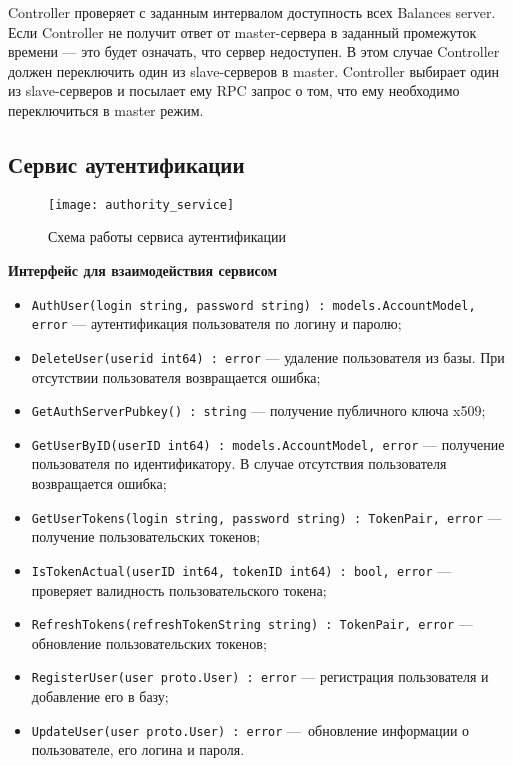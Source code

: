 Controller проверяет с заданным интервалом доступность всех Balances server. Если Controller не получит ответ от master-сервера в заданный промежуток времени — это будет означать, что сервер недоступен. В этом случае Controller должен переключить один из slave-серверов в master. Controller выбирает один из slave-серверов и посылает ему RPC запрос о том, что ему необходимо переключиться в master режим.

\subsection{Сервис аутентификации}

\begin{figure}[ht]
    \centering
    \texttt{[image: authority\_service]}
    \caption{Схема работы сервиса аутентификации}\label{fig:authority_service}
\end{figure}

\textbf{Интерфейс для взаимодействия сервисом}

\begin{itemize}
    \item \lstinline{AuthUser(login string, password string) : models.AccountModel, error} — аутентификация пользователя по логину и паролю;
    \item \lstinline{DeleteUser(userid int64) : error} — удаление пользователя из базы. При отсутствии пользователя возвращается ошибка;
    \item \lstinline{GetAuthServerPubkey() : string} — получение публичного ключа x509;
    \item \lstinline{GetUserByID(userID int64) : models.AccountModel, error} — получение пользователя по идентификатору. В случае отсутствия пользователя возвращается ошибка;
    \item \lstinline{GetUserTokens(login string, password string) : TokenPair, error} — получение пользовательских токенов;
    \item \lstinline{IsTokenActual(userID int64, tokenID int64) : bool, error} — проверяет валидность пользовательского токена;
    \item \lstinline{RefreshTokens(refreshTokenString string) : TokenPair, error} — обновление пользовательских токенов;
    \item \lstinline{RegisterUser(user proto.User) : error} — регистрация пользователя и добавление его в базу;
    \item \lstinline{UpdateUser(user proto.User) : error} — обновление информации о пользователе, его логина и пароля.
\end{itemize}

